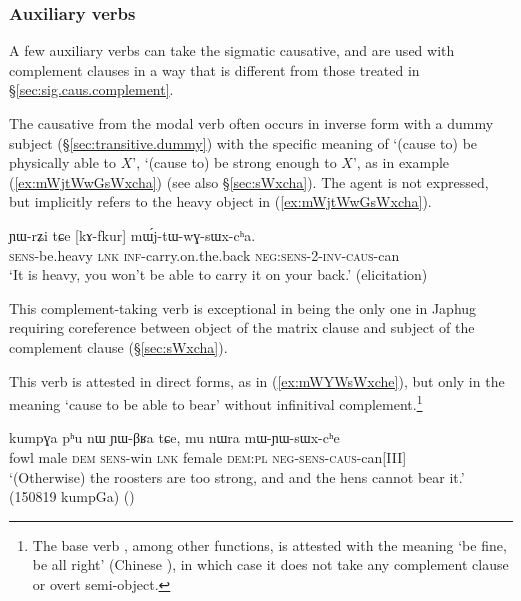 \subsubsection{Auxiliary verbs} \label{sec:sig.caus.modal}
A few auxiliary verbs can take the sigmatic causative, and are used with complement clauses in a way that is different from those treated in §\ref{sec:sig.caus.complement}. 

The causative  from the modal verb  often occurs in inverse form with a dummy subject (§\ref{sec:transitive.dummy}) with the specific meaning of  `(cause to) be physically able to $X$', `(cause to) be strong enough to $X$', as in example (\ref{ex:mWjtWwGsWxcha}) (see also §\ref{sec:sWxcha}). The agent is not expressed, but implicitly refers to the heavy object in (\ref{ex:mWjtWwGsWxcha}).  

\begin{exe}
\ex \label{ex:mWjtWwGsWxcha}
\gll ɲɯ-rʑi tɕe [kɤ-fkur] mɯ́j-tɯ-wɣ-sɯx-cʰa. \\
\textsc{sens}-be.heavy \textsc{lnk}  \textsc{inf}-carry.on.the.back \textsc{neg}:\textsc{sens}-\textsc{2}-\textsc{inv}-\textsc{caus}-can \\
\glt `It is heavy, you won't be able to carry it on your back.' (elicitation)
\end{exe}	

 This com\-ple\-ment-taking verb is exceptional in being the only one in Japhug requiring coreference between object of the matrix clause and subject of the complement clause (§\ref{sec:sWxcha}).

This verb is attested in direct forms, as in (\ref{ex:mWYWsWxche}), but only in the meaning `cause to be able to bear' without infinitival complement.\footnote{The base verb , among other functions, is attested with the meaning `be fine, be all right' (Chinese ), in which case it does not take any complement clause or overt semi-object. }

\begin{exe}
\ex \label{ex:mWYWsWxche}
\gll kumpɣa pʰu nɯ ɲɯ-βʁa tɕe, mu nɯra mɯ-ɲɯ-sɯx-cʰe\\
fowl male \textsc{dem} \textsc{sens}-win \textsc{lnk} female \textsc{dem}:\textsc{pl} \textsc{neg}-\textsc{sens}-\textsc{caus}-can[III] \\
\glt `(Otherwise) the roosters are too strong, and and the hens cannot bear it.' (150819 kumpGa)
()
\end{exe} 

